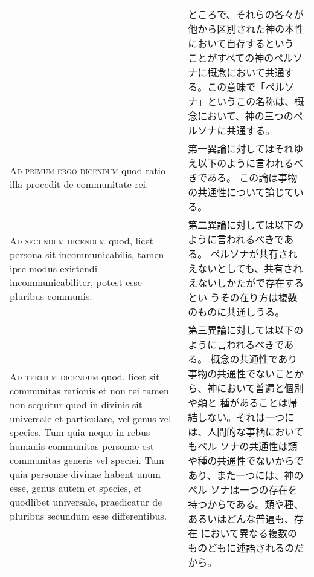 \documentclass[10pt]{jsarticle} %
\begin{document}
\begin{longtable}{p{21em}p{21em}}
&

ところで、それらの各々が他から区別された神の本性において自存するという
 ことがすべての神のペルソナに概念において共通する。この意味で「ペルソ
 ナ」というこの名称は、概念において、神の三つのペルソナに共通する。

\\



{\scshape Ad primum ergo dicendum} quod ratio illa procedit de communitate rei.

&

第一異論に対してはそれゆえ以下のように言われるべきである。
この論は事物の共通性について論じている。

\\



{\scshape Ad secundum dicendum} quod, licet persona sit incommunicabilis, tamen
ipse modus existendi incommunicabiliter, potest esse pluribus
communis.

&

第二異論に対しては以下のように言われるべきである。
ペルソナが共有されえないとしても、共有されえないしかたがで存在するとい
 うその在り方は複数のものに共通しうる。


\\



{\scshape Ad tertium dicendum} quod, licet sit communitas rationis et non rei
tamen non sequitur quod in divinis sit universale et particulare, vel
genus vel species. Tum quia neque in rebus humanis communitas personae
est communitas generis vel speciei. Tum quia personae divinae habent
unum esse, genus autem et species, et quodlibet universale,
praedicatur de pluribus secundum esse differentibus.

&

第三異論に対しては以下のように言われるべきである。
概念の共通性であり事物の共通性でないことから、神において普遍と個別や類と
 種があることは帰結しない。それは一つには、人間的な事柄においてもペル
 ソナの共通性は類や種の共通性でないからであり、また一つには、神のペル
 ソナは一つの存在を持つからである。類や種、あるいはどんな普遍も、存在
 において異なる複数のものどもに述語されるのだから。




\end{longtable}
\newpage
\end{document}
